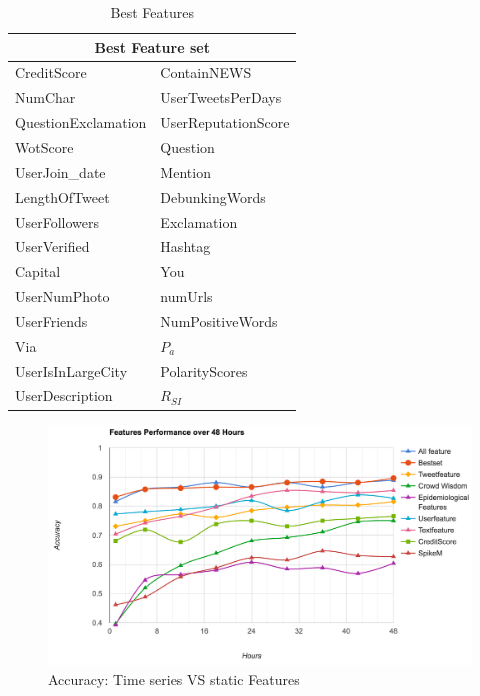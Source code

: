 \begin{table}[!h]
\centering
\begin{tabular}{l|l}
\hline

\multicolumn{2}{c}{Best Feature set} \\\hline

 CreditScore & ContainNEWS \\

NumChar  & UserTweetsPerDays\\
QuestionExclamation  & UserReputationScore\\ 
 
WotScore  & Question\\
UserJoin\_date  & Mention\\
LengthOfTweet  & DebunkingWords\\
UserFollowers  & Exclamation\\
UserVerified  &  Hashtag\\

Capital   & You\\
UserNumPhoto   & numUrls\\
UserFriends   & NumPositiveWords\\
Via   & $P_a$\\

UserIsInLargeCity  & PolarityScores \\UserDescription  & $R_{SI}$  \\ \bottomrule 
 \end{tabular}
\caption{Best Features}
\label{bestfeature}
\end{table}

 \begin{figure}[!h]
\centering
\includegraphics[width=\columnwidth]{images/allfeatures.png}
\caption{Accuracy: Time series VS static Features}
\label{fig:allfeature}
\end{figure}
 
